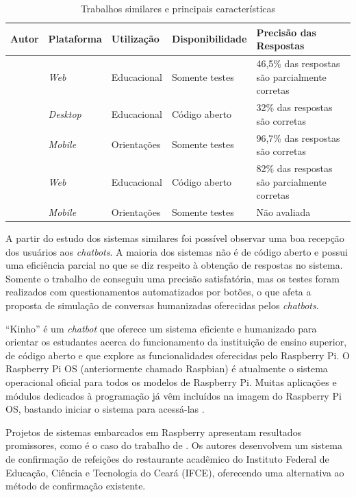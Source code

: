 \documentclass[12pt]{article}
\begin{document}
\begin{table}[h]
\caption{Trabalhos similares e principais características}
\label{table:1}
\begin{tabular}{ |p{3cm}|p{1.9cm}|p{2cm}|p{2.6cm}|p{3.4cm}|  }
 \hline
Autor & Plataforma & Utilização & Disponibilidade & Precisão das Respostas\\
 \hline
 \cite{araujo:20}   & {\itshape Web}    & Educacional &   Somente testes & 46,5\% das respostas são parcialmente corretas\\
  \hline
 \cite{bulhoes:20}&   {\itshape Desktop}  & Educacional   & Código aberto & 32\% das respostas são corretas
\\
 \hline
 \cite{silva:21} & {\itshape Mobile} & Orientações &  Somente testes & 96,7\% das respostas são corretas
\\
 \hline
 \cite{lucchesi:18}    & {\itshape Web} & Educacional & Código aberto & 82\% das respostas são parcialmente corretas \\
  \hline
 \cite{maciel:19}  & {\itshape Mobile}  & Orientações & Somente testes & Não avaliada
 \\
 \hline
\end{tabular}
\end{table}


A partir do estudo dos sistemas similares foi possível observar uma boa recepção dos usuários aos {\itshape chatbots}. A maioria dos sistemas não é de código aberto e possui uma eficiência parcial no que se diz respeito à obtenção de respostas no sistema. Somente o trabalho de \cite{silva:21} conseguiu uma precisão satisfatória, mas os testes foram realizados com questionamentos automatizados por botões, o que afeta a proposta de simulação de conversas humanizadas oferecidas pelos {\itshape chatbots}.

“Kinho” é um {\itshape chatbot} que oferece um sistema eficiente e humanizado para orientar os estudantes acerca do funcionamento da instituição de ensino superior, de código aberto e que explore as funcionalidades oferecidas pelo Raspberry Pi. O Raspberry Pi OS (anteriormente chamado Raspbian) é atualmente o sistema operacional oficial para todos os modelos de Raspberry Pi. Muitas aplicações e módulos dedicados à programação já vêm incluídos na imagem do Raspberry Pi OS, bastando iniciar o sistema para acessá-las \cite{juca:18}.

Projetos de sistemas embarcados em Raspberry apresentam resultados promissores, como é o caso do trabalho de \cite{junior:19}.  Os autores desenvolvem um sistema de confirmação de refeições do restaurante acadêmico do Instituto Federal de Educação, Ciência e Tecnologia do Ceará (IFCE), oferecendo uma alternativa ao método de confirmação existente. 
\end{document}
